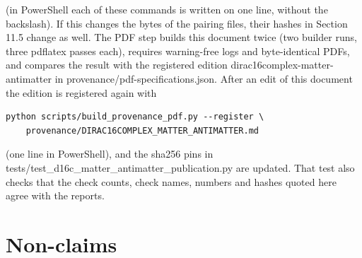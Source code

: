 \documentclass[11pt]{article}
\begin{document}
(in PowerShell each of these commands is written on one line, without the backslash). If this changes the bytes of the pairing files, their hashes in Section 11.5 change as well. The PDF step builds this document twice (two builder runs, three pdflatex passes each), requires warning-free logs and byte-identical PDFs, and compares the result with the registered edition dirac16complex-matter-antimatter in provenance/pdf-specifications.json. After an edit of this document the edition is registered again with

\begin{Verbatim}[fontsize=\small]
python scripts/build_provenance_pdf.py --register \
    provenance/DIRAC16COMPLEX_MATTER_ANTIMATTER.md
\end{Verbatim}

(one line in PowerShell), and the sha256 pins in tests/test\_d16c\_matter\_antimatter\_publication.py are updated. That test also checks that the check counts, check names, numbers and hashes quoted here agree with the reports.

\section{Non-claims}
\end{document}
